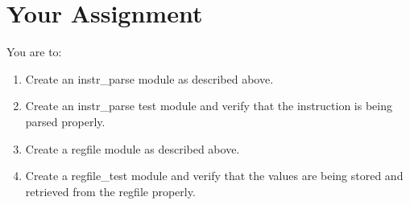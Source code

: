 \clearpage
\section{Your Assignment}

You are to:
\begin{enumerate}
\item Create an instr\_parse module as described above.
\item Create an instr\_parse test module and verify that the instruction is being parsed properly.
\item Create a regfile module as described above.
\item Create a regfile\_test module and verify that the values are being stored and retrieved from the regfile properly.
\end{enumerate} 